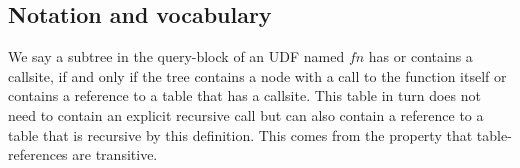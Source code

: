 

\subsection{Notation and vocabulary}


We say a subtree in the query-block of an UDF named $fn$ has or contains a callsite, if and only if the tree contains a node with a call to the function itself or contains a reference to a table that has a callsite. This table in turn does not need to contain an explicit recursive call but can also contain a reference to a table that is recursive by this definition. This comes from the property that table-references are transitive.



